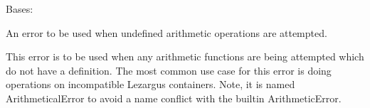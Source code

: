 \documentclass[letterpaper,11pt,english]{sphinxmanual}
\begin{document}

\begin{savenotes}\begin{fulllineitems}
\label{\detokenize{code/lezargus.library.logging:lezargus.library.logging.ArithmeticalError}}
\pysigstartsignatures
{}
\pysigstopsignatures
\sphinxAtStartPar
Bases: {\hyperref[\detokenize{code/lezargus.library.logging:lezargus.library.logging.LezargusError}]{}}

\sphinxAtStartPar
An error to be used when undefined arithmetic operations are attempted.

\sphinxAtStartPar
This error is to be used when any arithmetic functions are being attempted
which do not have a definition. The most common use case for this error is
doing operations on incompatible Lezargus containers. Note, it is named
ArithmeticalError to avoid a name conflict with the built\sphinxhyphen{}in
ArithmeticError.

\end{fulllineitems}\end{savenotes}

\end{document}
